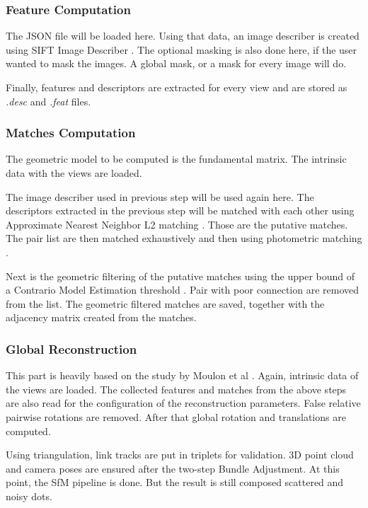 \documentclass[journal]{./IEEE/IEEEtran}
\begin{document}
    \subsubsection{Feature Computation}
    The JSON file will be loaded here. Using that data, an image describer is created using SIFT Image Describer \cite{SIFT}. The optional masking is also done here, if the user wanted to mask the images. A global mask, or a mask for every image will do.
    
    Finally, features and descriptors are extracted for every view and are stored as \textit{.desc} and \textit{.feat} files.
    
    \subsubsection{Matches Computation}
    The geometric model to be computed is the fundamental matrix. The intrinsic data with the views are loaded.
    
    The image describer used in previous step will be used again here. The descriptors extracted in the previous step will be matched with each other using Approximate Nearest Neighbor L2 matching \cite{AilonChazelle}. Those are the putative matches. The pair list are then matched exhaustively and then using photometric matching \cite{KoloShim}.
    
    Next is the geometric filtering of the putative matches using the upper bound of a Contrario Model Estimation threshold \cite{MMM}. Pair with poor connection are removed from the list. The geometric filtered matches are saved, together with the adjacency matrix created from the matches.
    
    \subsubsection{Global Reconstruction}
    This part is heavily based on the study by Moulon et al \cite{MoulonMonasseMarlet}. Again, intrinsic data of the views are loaded. The collected features and matches from the above steps are also read for the configuration of the reconstruction parameters. False relative pairwise rotations are removed. After that global rotation and translations are computed.
    
    Using triangulation, link tracks are put in triplets for validation. 3D point cloud and camera poses are ensured after the two-step Bundle Adjustment. At this point, the SfM pipeline is done. But the result is still composed scattered and noisy dots.
    
\end{document}
